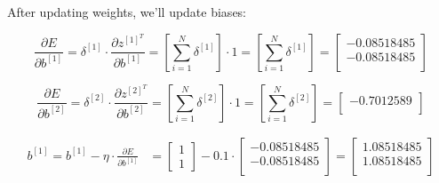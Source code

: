 \documentclass[12pt]{article}
\begin{document}
\begin{enumerate}[leftmargin=\labelsep]
        After updating weights, we'll update biases:

        \begin{equation*}
          \frac{\partial E}{\partial b^{[1]}} = \delta^{[1]} \cdot
          \frac{\partial z^{[1]^T}}{\partial b^{[1]}}
          = \left[\sum_{i=1}^N \delta^{[1]}\right] \cdot 1
          = \left[\sum_{i=1}^N \delta^{[1]}\right]
          = \begin{bmatrix}
            -0.08518485 \\
            -0.08518485 \\
          \end{bmatrix}
        \end{equation*}

        \begin{equation*}
          \frac{\partial E}{\partial b^{[2]}} = \delta^{[2]} \cdot
          \frac{\partial z^{[2]^T}}{\partial b^{[2]}}
          = \left[\sum_{i=1}^N \delta^{[2]}\right] \cdot 1
          = \left[\sum_{i=1}^N \delta^{[2]}\right]
          = \begin{bmatrix}
            -0.7012589 \\
          \end{bmatrix}
        \end{equation*}

        \begin{equation*}
          \begin{aligned}
            b^{[1]} = b^{[1]} - \eta \cdot \frac{\partial E}{\partial b^{[1]}}
             & = \begin{bmatrix}
                   1 \\
                   1
                 \end{bmatrix} - 0.1 \cdot \begin{bmatrix}
                                             -0.08518485 \\
                                             -0.08518485 \\
                                           \end{bmatrix} = \begin{bmatrix}
                                                             1.08518485 \\
                                                             1.08518485 \\
                                                           \end{bmatrix}
          \end{aligned}
        \end{equation*}


\end{enumerate}
\end{document}
